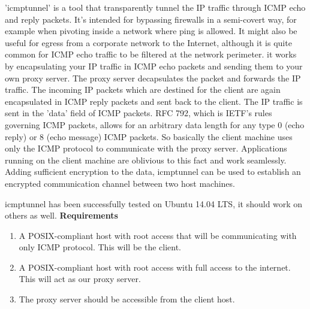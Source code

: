 %
%
'icmptunnel' is a tool that transparently tunnel the IP traffic through ICMP echo and reply packets.
It’s intended for bypassing firewalls in a semi-covert way, for example when pivoting inside a network where ping is allowed. 
It might also be useful for egress from a corporate network to the Internet, although it is quite common for ICMP echo traffic to be filtered at the network perimeter.
\vspace{2ex} \newline
it works by encapsulating your IP traffic in ICMP echo packets and sending them to your own proxy server. 
The proxy server decapsulates the packet and forwards the IP traffic. 
The incoming IP packets which are destined for the client are again encapsulated in ICMP reply packets and sent back to the client. 
The IP traffic is sent in the 'data' field of ICMP packets.
\vspace{1ex} \newline
RFC 792, which is IETF's rules governing ICMP packets, allows for an arbitrary data length for any type 0 (echo reply) or 8 (echo message) ICMP packets.
\vspace{1ex} \newline
So basically the client machine uses only the ICMP protocol to communicate with the proxy server. 
Applications running on the client machine are oblivious to this fact and work seamlessly. 
%
Adding sufficient encryption to the data, icmptunnel can be used to establish an encrypted communication channel between two host machines.

icmptunnel has been successfully tested on Ubuntu 14.04 LTS, it should work on others as well.
\vspace{2ex} \newline 
\textbf{Requirements}
\begin{enumerate}
    \item A POSIX-compliant host with root access that will be communicating with only ICMP protocol. This will be the client.
    \item A POSIX-compliant host with root access with full access to the internet. This will act as our proxy server.
    \item The proxy server should be accessible from the client host.
\end{enumerate} 


